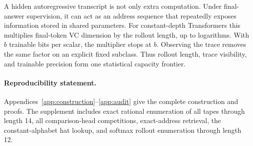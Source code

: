 \documentclass{article}
\newcommand{\1}{\mathbf 1}
\begin{document}
A hidden autoregressive transcript is not only extra computation. Under final-answer supervision,
it can act as an address sequence that repeatedly exposes information stored in shared parameters.
For constant-depth Transformers this multiplies final-token VC dimension by the rollout length,
up to logarithms. With $b$ trainable bits per scalar, the multiplier stops at $b$. Observing the
trace removes the same factor on an explicit fixed subclass. Thus rollout length, trace visibility,
and trainable precision form one statistical capacity frontier.

\paragraph{Reproducibility statement.}
Appendices~\ref{app:construction}--\ref{app:audit} give the complete construction and proofs. The
supplement includes exact rational enumeration of all tapes through length 14, all comparison-head
competitions, exact-address retrieval, the constant-alphabet hat lookup, and softmax rollout enumeration
through length 12.





\end{document}
